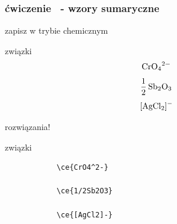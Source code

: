 \documentclass{beamer}
\theoremstyle{newblock}
\begin{document}
\begin{frame}[fragile=singleslide]
    \frametitle{ćwiczenie \showmycounter \ - wzory sumaryczne}
    zapisz w trybie chemicznym 
    
    \begin{exampleblock}{związki}
        \begin{equation}
            \ce{CrO4^2-}
        \end{equation}
        \begin{equation}
            \ce{1/2Sb2O3}
        \end{equation}
        \begin{equation}
            \ce{[AgCl2]-}
        \end{equation}
    \end{exampleblock}
\end{frame}

\begin{frame}[fragile=singleslide]{rozwiązania!}
\begin{exampleblock}{związki}
    \begin{verbatim}
            \ce{CrO4^2-}

            \ce{1/2Sb2O3}

            \ce{[AgCl2]-}
    \end{verbatim}    
\end{exampleblock}
\end{frame}
\end{document}
